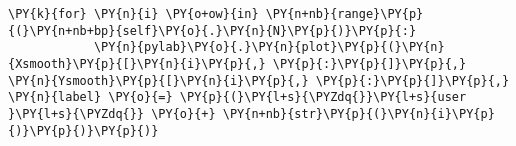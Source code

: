 \begin{Verbatim}[commandchars=\\\{\}]
        \PY{k}{for} \PY{n}{i} \PY{o+ow}{in} \PY{n+nb}{range}\PY{p}{(}\PY{n+nb+bp}{self}\PY{o}{.}\PY{n}{N}\PY{p}{)}\PY{p}{:}
            \PY{n}{pylab}\PY{o}{.}\PY{n}{plot}\PY{p}{(}\PY{n}{Xsmooth}\PY{p}{[}\PY{n}{i}\PY{p}{,} \PY{p}{:}\PY{p}{]}\PY{p}{,} \PY{n}{Ysmooth}\PY{p}{[}\PY{n}{i}\PY{p}{,} \PY{p}{:}\PY{p}{]}\PY{p}{,} \PY{n}{label} \PY{o}{=} \PY{p}{(}\PY{l+s}{\PYZdq{}}\PY{l+s}{user }\PY{l+s}{\PYZdq{}} \PY{o}{+} \PY{n+nb}{str}\PY{p}{(}\PY{n}{i}\PY{p}{)}\PY{p}{)}\PY{p}{)}
\end{Verbatim}
